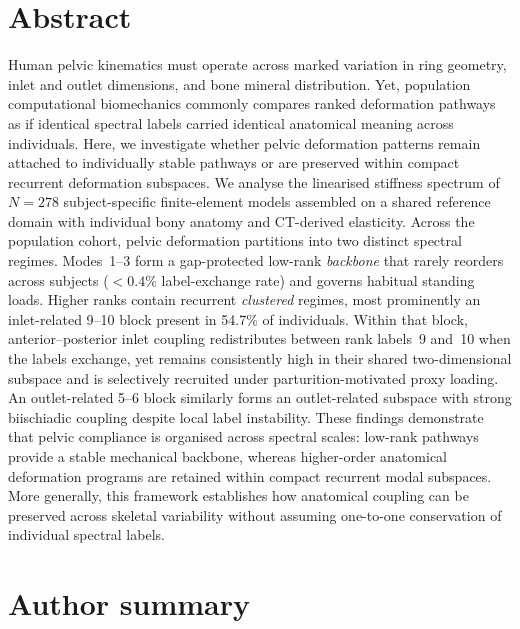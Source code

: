 \documentclass[11pt]{article}
\begin{document}
\section*{Abstract}
Human pelvic kinematics must operate across marked variation in ring geometry, inlet and outlet dimensions, and bone mineral distribution.
Yet, population computational biomechanics commonly compares ranked deformation pathways as if identical spectral labels carried identical anatomical meaning across individuals.
Here, we investigate whether pelvic deformation patterns remain attached to individually stable pathways or are preserved within compact recurrent deformation subspaces.
We analyse the linearised stiffness spectrum of $N{=}278$ subject-specific finite-element models assembled on a shared reference domain with individual bony anatomy and CT-derived elasticity.
Across the population cohort, pelvic deformation partitions into two distinct spectral regimes.
Modes~1--3 form a gap-protected low-rank \emph{backbone} that rarely reorders across subjects ($<0.4\%$ label-exchange rate) and governs habitual standing loads.
Higher ranks contain recurrent \emph{clustered} regimes, most prominently an inlet-related 9--10 block present in 54.7\% of individuals.
Within that block, anterior--posterior inlet coupling redistributes between rank labels~9 and~10 when the labels exchange, yet remains consistently high in their shared two-dimensional subspace and is selectively recruited under parturition-motivated proxy loading.
An outlet-related 5--6 block similarly forms an outlet-related subspace with strong biischiadic coupling despite local label instability.
These findings demonstrate that pelvic compliance is organised across spectral scales: low-rank pathways provide a stable mechanical backbone, whereas higher-order anatomical deformation programs are retained within compact recurrent modal subspaces.
More generally, this framework establishes how anatomical coupling can be preserved across skeletal variability without assuming one-to-one conservation of individual spectral labels.

\section*{Author summary}
\end{document}
